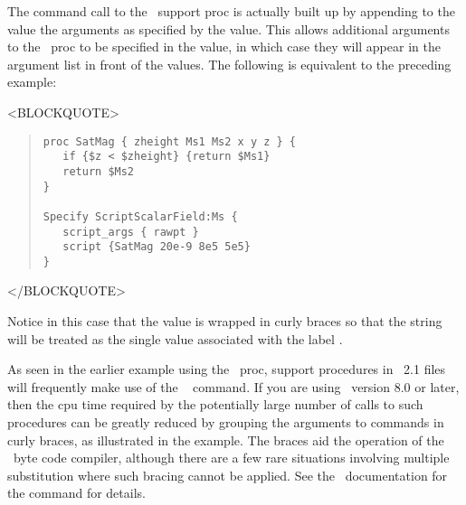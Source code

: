The command call to the \Tcl\ support proc is actually built up by
appending to the  value the arguments as specified by the
 value.  This allows additional arguments to the
\Tcl\ proc to be specified in the  value, in which case
they will appear in the argument list in front of the
 values.  The following is equivalent to the
preceding example:
\begin{rawhtml}<BLOCKQUOTE>\end{rawhtml}
\begin{quote}
\begin{verbatim}
proc SatMag { zheight Ms1 Ms2 x y z } {
   if {$z < $zheight} {return $Ms1}
   return $Ms2
}

Specify ScriptScalarField:Ms {
   script_args { rawpt }
   script {SatMag 20e-9 8e5 5e5}
}
\end{verbatim}
\end{quote}
\begin{rawhtml}</BLOCKQUOTE>\end{rawhtml}
Notice in this case that the  value is wrapped in curly
braces so that the string  will be treated as
the single value associated with the label .

As seen in the earlier example using the  \Tcl\ proc,
support procedures in \MIF~2.1 files will frequently make use of the
\Tcl\  command.  If you are using \Tcl\ version 8.0 or later,
then the cpu time required by the potentially large number of calls to
such procedures can be greatly reduced by grouping the arguments to
 commands in curly braces, as illustrated in the
 example.  The braces aid the operation of the \Tcl\
byte code compiler, although there are a few rare situations involving
multiple substitution where such bracing cannot be applied.  See the
\Tcl\ documentation for the \cd{expr} command for details.

